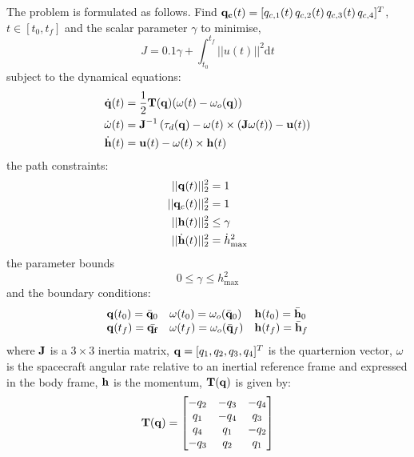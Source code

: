 \documentclass[a4paper,11pt]{report}    %
\newcommand{\mt}[1]{\ensuremath \mathbf{#1}}
\begin{document}
The problem is formulated as follows. Find $\mt{q_c}(t) = [q_{c,1}(t) \, q_{c,2}(t) \, q_{c,3}(t) \, q_{c,4}]^T$, $t \in [t_0,t_f]$ and 
the scalar parameter $\gamma$ to minimise,
\begin{equation}
  J = 0.1 \gamma + \int_{t_0}^{t_f} || u(t) ||^2 \mathrm{d} t
\end{equation}
subject to the dynamical equations:
\begin{equation}
\begin{aligned}
 \dot{ \mt{q}}(t) &= \frac{1}{2} \mt{T}(\mt{q})( \omega(t)-\omega_o(\mt{q}))  \\
 \dot{ \mt{\omega}}(t) &= \mt{J}^{-1} \left( \tau_d(\mt{q}) - \omega(t) \times(\mt{J} \omega(t) ) - \mt{u}(t) \right) \\
 \dot{ \mt{h} }(t) &= \mt{u}(t) - \omega(t) \times \mt{h}(t) \\
\end{aligned}
\end{equation}
the path constraints:
\begin{equation}
 \begin{aligned}
   || \mt{q}(t) ||^2_2 &= 1 \\
   || \mt{q}_c(t) ||^2_2 &= 1 \\
   || \mt{h}(t) ||^2_2 &\le \gamma \\
   || \dot{\mt{h}}(t) ||^2_2 &= \dot h^2_{\max} \\
 \end{aligned}
\end{equation}
the parameter bounds
\begin{equation}
  0 \le \gamma \le h_{\max}^2
\end{equation}
and the boundary conditions:
\begin{equation}
  \begin{array}{lll}
     \mt{q}(t_0) = \bar{\mt{q}}_0 & \omega(t_0) = \omega_o(\bar {\mt{q}}_0) & \mt{h}(t_0) = \bar{\mt{h}}_0 \\
     \mt{q}(t_f) = \bar{\mt{q_f}} & \omega(t_f) = \omega_o(\bar {\mt{q}}_f) & \mt{h}(t_f) = \bar{\mt{h}}_f 
  \end{array}
\end{equation}
where $\mt{J}$ is a $3 \times 3$ inertia matrix, $\mt{q} = [q_1, q_2, q_3, q_4]^T$ is the quarternion vector, $\omega$ is the spacecraft angular rate relative to an
inertial reference frame and expressed in the body frame, $\mt{h}$ is the
momentum, $\mt{T}(\mt{q})$ is given by:
\begin{equation}
  \mt{T}(\mt{q}) = \begin{bmatrix} 
-q_2 & -q_3 &-q_4 \\
q_1 &-q_4 & q_3 \\
q_4 & q_1 & -q_2 \\
-q_3 & q_2 & q_1 
\end{bmatrix}
\end{equation}
\end{document}
